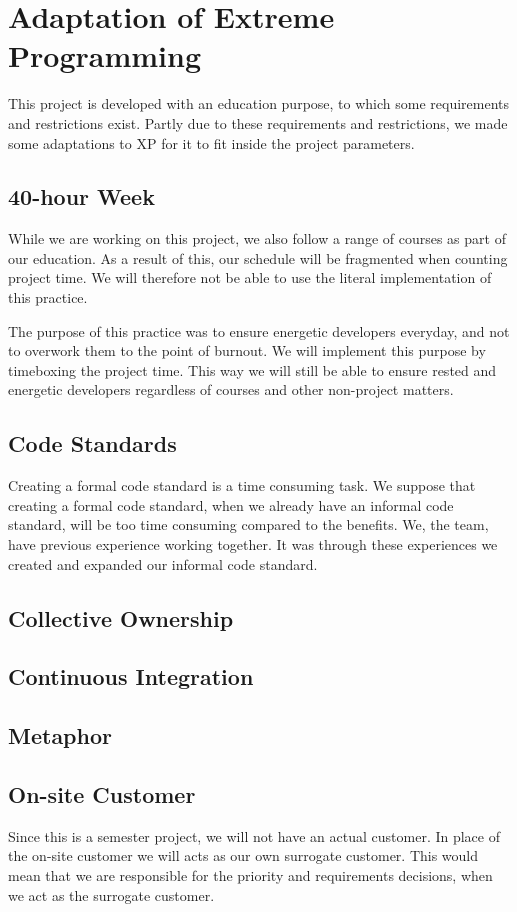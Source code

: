 \section{Adaptation of Extreme Programming}
This project is developed with an education purpose, to which some requirements and restrictions exist.
Partly due to these requirements and restrictions, we made some adaptations to XP for it to fit inside the project parameters.

\subsection{40-hour Week}
While we are working on this project, we also follow a range of courses as part of our education.
As a result of this, our schedule will be fragmented when counting project time.
We will therefore not be able to use the literal implementation of this practice.

The purpose of this practice was to ensure energetic developers everyday, and not to overwork them to the point of burnout.
We will implement this purpose by timeboxing the project time.
This way we will still be able to ensure rested and energetic developers regardless of courses and other non-project matters.

\subsection{Code Standards}
Creating a formal code standard is a time consuming task.
We suppose that creating a formal code standard, when we already have an informal code standard, will be too time consuming compared to the benefits.
We, the team, have previous experience working together.
It was through these experiences we created and expanded our informal code standard.

\subsection{Collective Ownership}


\subsection{Continuous Integration}


\subsection{Metaphor}


\subsection{On-site Customer}
Since this is a semester project, we will not have an actual customer.
In place of the on-site customer we will acts as our own surrogate customer.
This would mean that we are responsible for the priority and requirements decisions, when we act as the surrogate customer.

